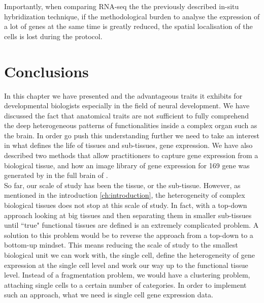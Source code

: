     Importantly, when comparing RNA-seq the the previously described in-situ hybridization technique, if the methodological burden to analyse the expression of a lot of genes at the same time is greatly reduced, the spatial localisation of the cells is lost during the protocol.\\
    
\section{Conclusions}
     
     In this chapter we have presented \platyfull{} and the advantageous traits it exhibits for developmental biologists especially in the field of neural development. We have discussed the fact that anatomical traits are not sufficient to fully comprehend the deep heterogeneous patterns of functionalities inside a complex organ such as the brain. In order go push this understanding further we need to take an interest in what defines the life of tissues and sub-tissues, gene expression. We have also described two methods that allow practitioners to capture gene expression from a biological tissue, and how an image library  of gene expression for 169 gene was generated by \cite{Tomer10} in the full brain of \platy{}.\\
     
	So far, our scale of study has been the tissue, or the sub-tissue. However, as mentioned in the introduction \ref{ch:introduction}, the heterogeneity of complex biological tissues does not stop at this scale of study. In fact, with a top-down approach looking at big tissues and then separating them in smaller sub-tissues until ``true" functional tissues are defined is an extremely complicated problem. A solution to this problem would be to reverse the approach from a top-down to a bottom-up mindset. This means reducing the scale of study to the smallest biological unit we can work with, the single cell, define the heterogeneity of gene expression at the single cell level and work our way up to the functional tissue level. Instead of a fragmentation problem, we would have a clustering problem, attaching single cells to a certain number of categories. In order to implement such an approach, what we need is single cell gene expression data.

%
%
%
%
%




